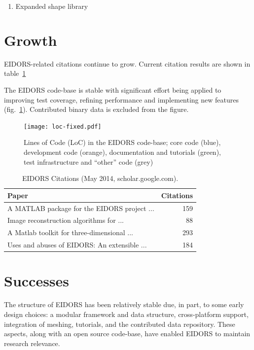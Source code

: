 \documentclass[10pt,a4paper]{article}
\begin{document}
\begin{multicols}{2}
\begin{enumerate}
\item Expanded shape library
\end{enumerate}

\section{Growth}
EIDORS-related citations continue to grow. Current citation results are
shown in table~\ref{tbl:cite}

The EIDORS code-base is stable with significant effort being applied to
improving test coverage, refining performance and implementing new features
(fig.~\ref{fig:loc}). Contributed binary data is excluded from the figure.

\begin{figure}[H]
  \vspace{-2.5em}
\centering
\texttt{[image: loc-fixed.pdf]}
\caption{\label{fig:loc}%
  Lines of Code (LoC) in the EIDORS code-base; core code (blue), development code (orange),
  documentation and tutorials (green), test infrastructure and ``other'' code (grey)
}
\end{figure}
\vspace{-1.5em}
\begin{table}[H]
  \footnotesize
\centering
\caption{\label{tbl:cite} EIDORS Citations
 (May 2014, scholar.google.com).
}
\begin{tabular}{lr}
  \toprule
  Paper & Citations \\
  \midrule
  \cite{vauhkonen2001} A MATLAB package for the EIDORS project {\tiny ...}  & 159 \\
  \cite{polydorides2002phd} Image reconstruction algorithms for {\tiny ...}  & 88 \\
  \cite{polydorides2002matlab} A Matlab toolkit for three-dimensional {\tiny ...}  & 293 \\
  \cite{adler2006} Uses and abuses of {EIDORS}: An extensible {\tiny ...} & 184 \\
  \bottomrule
\end{tabular}
\vspace{-1em}
\end{table}

\section{Successes}
The structure of EIDORS has been relatively stable due, in part, to some early design choices:
a modular framework and data structure,
cross-platform support, integration of meshing,
tutorials, and the contributed data repository.
These aspects, along with an open source code-base, have enabled EIDORS to
maintain research relevance.


\end{multicols}
\end{document}

